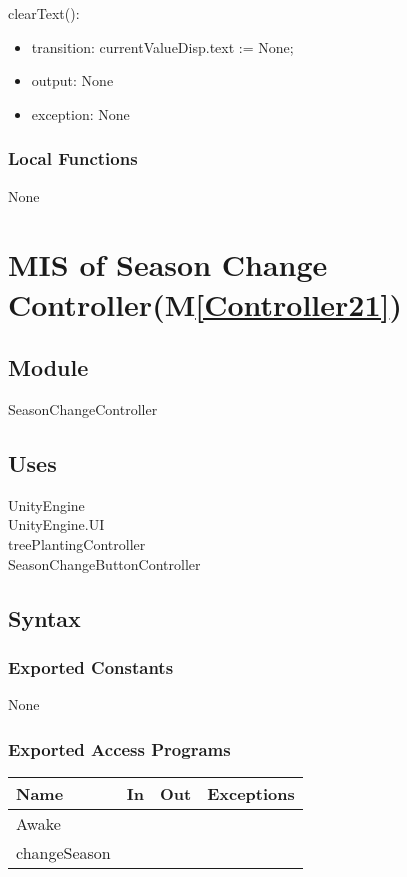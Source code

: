 \documentclass[12pt, titlepage]{article}
\newcommand{\mref}[1]{M\ref{#1}}
\begin{document}
\noindent clearText():
\begin{itemize}
\item transition:  currentValueDisp.text := None;
\item output: None
\item exception: None
\end{itemize}

\subsubsection{Local Functions}
None


\newpage


\section{MIS of Season Change Controller(\mref{Controller21})}  

\subsection{Module}

SeasonChangeController

\subsection{Uses}
UnityEngine\\
UnityEngine.UI\\
treePlantingController\\
SeasonChangeButtonController

\subsection{Syntax}
\subsubsection{Exported Constants}
None
\subsubsection{Exported Access Programs}

\begin{center}
\begin{tabular}{| l | l | l | p{5cm}|}
\hline
\textbf{Name} & \textbf{In} & \textbf{Out} & \textbf{Exceptions} \\
\hline
Awake &  &  &  \\
\hline
changeSeason &  & & \\
\hline
\end{tabular}
\end{center}
\end{document}
